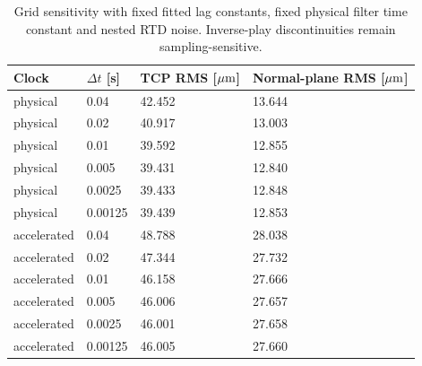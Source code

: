 \begin{table}[H]\centering\small
\begin{tabular}{llll}\toprule
Clock & $\Delta t$ [s] & TCP RMS [$\mu\mathrm{m}$] & Normal-plane RMS [$\mu\mathrm{m}$]\\\midrule
physical & 0.04 & 42.452 & 13.644\\
physical & 0.02 & 40.917 & 13.003\\
physical & 0.01 & 39.592 & 12.855\\
physical & 0.005 & 39.431 & 12.840\\
physical & 0.0025 & 39.433 & 12.848\\
physical & 0.00125 & 39.439 & 12.853\\
accelerated & 0.04 & 48.788 & 28.038\\
accelerated & 0.02 & 47.344 & 27.732\\
accelerated & 0.01 & 46.158 & 27.666\\
accelerated & 0.005 & 46.006 & 27.657\\
accelerated & 0.0025 & 46.001 & 27.658\\
accelerated & 0.00125 & 46.005 & 27.660\\
\bottomrule\end{tabular}\caption{Grid sensitivity with fixed fitted lag constants, fixed physical filter time constant and nested RTD noise. Inverse-play discontinuities remain sampling-sensitive.}\label{tab:publication_grid_table}\end{table}
